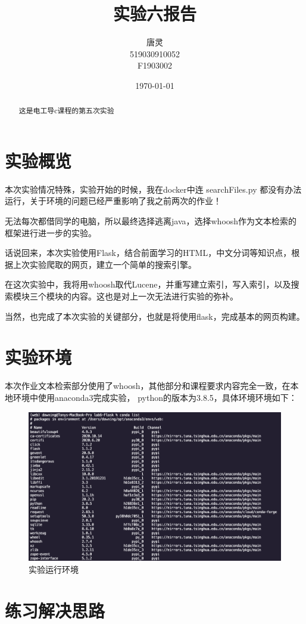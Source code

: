 \documentclass[UTF8]{ctexart}
\title{实验六报告}
\author{唐灵\\519030910052\\F1903002}
\date{\today}
\begin{document}
    \maketitle
    \begin{abstract}
        这是电工导c课程的第五次实验
    \end{abstract}
    \section{实验概览}
        本次实验情况特殊，实验开始的时候，我在docker中连 searchFiles.py 都没有办法运行，关于环境的问题已经严重影响了我之前两次的作业！

        无法每次都借同学的电脑，所以最终选择逃离java，选择whoosh作为文本检索的框架进行进一步的实验。
        
        话说回来，本次实验使用Flask，结合前面学习的HTML，中文分词等知识点，根据上次实验爬取的网页，建立一个简单的搜索引擎。

        在这次实验中，我将用whoosh取代Lucene，并重写建立索引，写入索引，以及搜索模块三个模块的内容。这也是对上一次无法进行实验的弥补。
        
        当然，也完成了本次实验的关键部分，也就是将使用flask，完成基本的网页构建。
    \section{实验环境}
        本次作业文本检索部分使用了whoosh，其他部分和课程要求内容完全一致，在本地环境中使用anaconda3完成实验，
        python的版本为3.8.5，具体环境环境如下：      
    \begin{figure}[ht]
        \centering
        \includegraphics[scale=0.33]{img/env.png}
        \caption{实验运行环境}
    \end{figure} 
    \section{练习解决思路}
\end{document}
